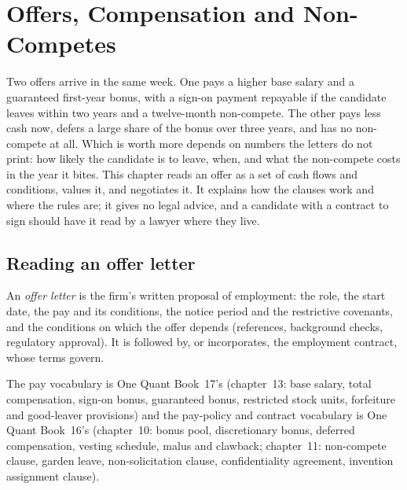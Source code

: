 \chapter{Offers, Compensation and Non-Competes}\label{ch:iv:offers-compensation-and-non-competes}

Two offers arrive in the same week. One pays a higher base salary and a guaranteed first-year bonus, with a
sign-on payment repayable if the candidate leaves within two years and a twelve-month non-compete. The other
pays less cash now, defers a large share of the bonus over three years, and has no non-compete at all. Which is
worth more depends on numbers the letters do not print: how likely the candidate is to leave, when, and what
the non-compete costs in the year it bites. This chapter reads an offer as a set of cash flows and conditions,
values it, and negotiates it. It explains how the clauses work and where the rules are; it gives no legal
advice, and a candidate with a contract to sign should have it read by a lawyer where they live.

\section{Reading an offer letter}

\begin{definition}\label{def:iv:offers-compensation-and-non-competes:letter}
An \emph{offer letter} is the firm's written proposal of employment: the role, the start
date, the pay and its conditions, the notice period and the restrictive covenants, and the conditions on which
the offer depends (references, background checks, regulatory approval). It is followed by, or incorporates,
the employment contract, whose terms govern.
\end{definition}

The pay vocabulary is One Quant Book~17's (chapter~13: base salary, total compensation, sign-on bonus,
guaranteed bonus, restricted stock units, forfeiture and good-leaver provisions) and the pay-policy and
contract vocabulary is One Quant Book~16's (chapter~10: bonus pool, discretionary bonus, deferred compensation,
vesting schedule, malus and clawback; chapter~11: non-compete clause, garden leave, non-solicitation clause,
confidentiality agreement, invention assignment clause).

